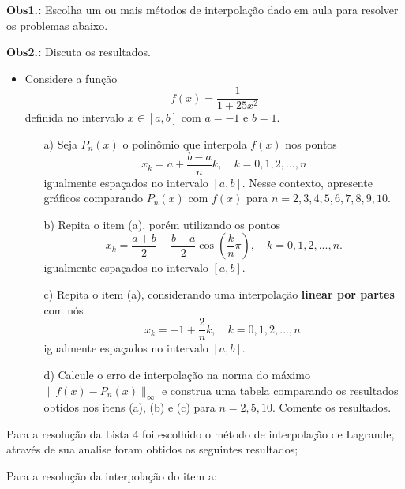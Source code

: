 \documentclass{article}
\newcounter{execs}
\newcommand{\exec}[0]{\addtocounter{execs}{1}\item[\textbf{\arabic{execs}.}]}
\begin{document}
\thispagestyle{first}
\noindent \textbf{Obs1.:}  Escolha um ou mais métodos de interpolação dado em aula para resolver os problemas abaixo.

\noindent \textbf{Obs2.:}  Discuta os resultados.

\begin{itemize}

\exec Considere a função
$$
f(x)=\dfrac{1}{1+25x^2}
$$
definida no intervalo $x\in [a,b]$ com $a=-1$ e $b=1$. 

\begin{itemize}

\item[a)] Seja $P_n(x)$ o polinômio que interpola $f(x)$ nos pontos
$$
x_k = a + \dfrac{b-a}{n}k, \quad k = 0,1,2,...,n
$$
igualmente espaçados no intervalo $[a,b]$. Nesse contexto,
apresente gráficos comparando $P_n(x)$ com $f(x)$ para $n= 2,3,4,5,6,7,8,9,10$.

\item [b)] Repita o item (a), porém utilizando os pontos
$$
x_k = \dfrac{a+b}{2} - \dfrac{b-a}{2}\cos\left(\dfrac{k}{n}\pi \right), \quad k = 0,1,2,...,n.
$$
igualmente espaçados no intervalo $[a,b]$.
\item [c)] Repita o item (a), considerando  uma interpolação \textbf{linear por partes} com nós
$$
x_k = -1 + \dfrac{2}{n}k, \quad k = 0,1,2,...,n.
$$
igualmente espaçados no intervalo $[a,b]$.

\item [d)] Calcule o erro de interpolação na norma do máximo $\|f(x)-P_n(x)\|_{\infty} $ e construa uma tabela comparando os resultados obtidos nos itens (a), (b) e (c) para $n = 2,5,10$. Comente os resultados.

\end{itemize}

\end{itemize}

Para a resolução da Lista 4 foi escolhido o método de interpolação de Lagrande, através de sua analise foram obtidos os seguintes resultados;

\newpage
\text Para a resolução da interpolação do item a:
\end{document}
